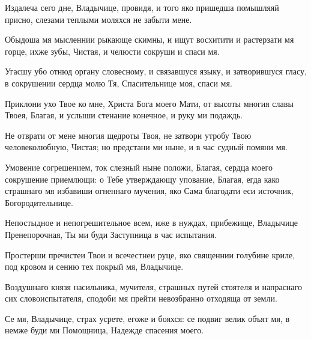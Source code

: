 \begin{mymulticols}

Издалеча сего дне, Владычице, провидя, и того яко пришедша помышляяй присно, слезами теплыми моляхся не забыти мене.


Обыдоша мя мысленнии рыкающе скимны, и ищут восхитити и растерзати мя горце, ихже зубы, Чистая, и челюсти сокруши и спаси мя.


Угасшу убо отнюд органу словесному, и связавшуся языку, и затворившуся гласу, в сокрушении сердца молю Тя, Спасительнице моя, спаси мя.

\slava

Приклони ухо Твое ко мне, Христа Бога моего Мати, от высоты многия славы Твоея, Благая, и услыши стенание конечное, и руку ми подаждь.

\inyne

Не отврати от мене многия щедроты Твоя, не затвори утробу Твою человеколюбную, Чистая; но предстани ми ныне, и в час судный помяни мя.




Умовение согрешением, ток слезный ныне положи, Благая, сердца моего сокрушение приемлющи: о Тебе утверждающу упование, Благая, егда како страшнаго мя избавиши огненнаго мучения, яко Сама благодати еси источник, Богородительнице.


Непостыдное и непогрешительное всем, иже в нуждах, прибежище, Владычице Пренепорочная, Ты ми буди Заступница в час испытания.


Простерши пречистеи Твои и всечестнеи руце, яко священнии голубине криле, под кровом и сению тех покрый мя, Владычице.

\slava

Воздушнаго князя насильника, мучителя, страшных путей стоятеля и напраснаго сих словоиспытателя, сподоби мя прейти невозбранно отходяща от земли.

\inyne

Се мя, Владычице, страх усрете, егоже и бояхся: се подвиг велик объят мя, в немже буди ми Помощница, Надежде спасения моего.


\end{mymulticols}
